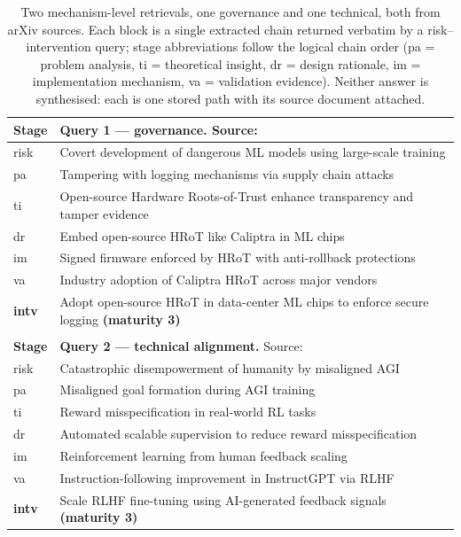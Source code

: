 \documentclass[10pt,twocolumn,letterpaper]{article}
\begin{document}
\begin{table}[t]
\centering
\small
\begin{tabular}{p{}p{}}
\toprule
\textbf{Stage} & \textbf{Query 1 --- governance.} Source: \citet{shavit2023chinchilla} \\
\midrule
risk & Covert development of dangerous ML models using large-scale training \\
pa & Tampering with logging mechanisms via supply chain attacks \\
ti & Open-source Hardware Roots-of-Trust enhance transparency and tamper evidence \\
dr & Embed open-source HRoT like Caliptra in ML chips \\
im & Signed firmware enforced by HRoT with anti-rollback protections \\
va & Industry adoption of Caliptra HRoT across major vendors \\
\textbf{intv} & Adopt open-source HRoT in data-center ML chips to enforce secure logging \textbf{(maturity 3)} \\
\midrule
\multicolumn{2}{c}{} \\
\midrule
\textbf{Stage} & \textbf{Query 2 --- technical alignment.} Source: \citet{ngo2022alignment} \\
\midrule
risk & Catastrophic disempowerment of humanity by misaligned AGI \\
pa & Misaligned goal formation during AGI training \\
ti & Reward misspecification in real-world RL tasks \\
dr & Automated scalable supervision to reduce reward misspecification \\
im & Reinforcement learning from human feedback scaling \\
va & Instruction-following improvement in InstructGPT via RLHF \\
\textbf{intv} & Scale RLHF fine-tuning using AI-generated feedback signals \textbf{(maturity 3)} \\
\bottomrule
\end{tabular}
\caption{Two mechanism-level retrievals, one governance and one technical, both from
arXiv sources. Each block is a single extracted chain returned verbatim by a
risk--intervention query; stage abbreviations follow the logical chain order
(pa = problem analysis, ti = theoretical insight, dr = design rationale,
im = implementation mechanism, va = validation evidence). Neither answer is synthesised:
each is one stored path with its source document attached.}
\label{tab:query}
\end{table}
\end{document}
